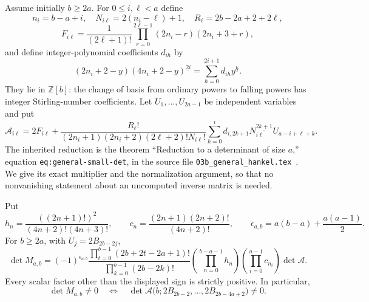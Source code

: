 Assume initially $b\ge2a$. For $0\le i,\ell<a$ define
\[
 n_i=b-a+i,\quad N_{i\ell}=2(n_i-\ell)+1,\quad
 R_\ell=2b-2a+2+2\ell,
\]
\[
 F_{i\ell}=\frac1{(2\ell+1)!}
 \prod_{r=0}^{2\ell-1}(2n_i-r)(2n_i+3+r),
\]
and define integer-polynomial coefficients $d_{ih}$ by
\begin{equation}\label{ert:newton}
 (2n_i+2-y)(4n_i+2-y)^{\underline{2i}}
       =\sum_{h=0}^{2i+1}d_{ih}y^{\underline h}.
\end{equation}
They lie in $\mathbb Z[b]$: the change of basis from ordinary
powers to falling powers has integer Stirling-number coefficients.
Let $U_1,\ldots,U_{2a-1}$ be independent variables and put
\begin{equation}\label{ert:A}
 \mathcal A_{i\ell}=2F_{i\ell}+
 \frac{R_\ell!}
 {(2n_i+1)(2n_i+2)(2\ell+2)!N_{i\ell}!}
 \sum_{k=0}^{i}d_{i,2k+1}N_{i\ell}^{\underline{2k+1}}
            U_{a-i+\ell+k}.
\end{equation}
The inherited reduction is the theorem ``Reduction to a determinant
of size $a$,'' equation \texttt{eq:general-small-det}, in the source
file \texttt{03b\_general\_hankel.tex}~\cite{GeneralHankel}.
We give its exact multiplier and the normalization argument, so
that no nonvanishing statement about an uncomputed inverse matrix
is needed.

\begin{lemma}
\label{ert:normalization}
Put
\[
 h_n=\frac{((2n+1)!)^2}{(4n+2)!(4n+3)!},\qquad
 c_n=\frac{(2n+1)(2n+2)!}{(4n+2)!},
 \qquad \epsilon_{a,b}=a(b-a)+\frac{a(a-1)}2.
\]
For $b\ge2a$, with $U_j=2B_{2b-2j}$,
\begin{equation}\label{ert:exact-multiplier}
 \det M_{a,b}=(-1)^{\epsilon_{a,b}}
 \frac{\prod_{t=0}^{b-1}(2b+2t-2a+1)!}
      {\prod_{k=0}^{b-1}(2b-2k)!}
 \left(\prod_{n=0}^{b-a-1}h_n\right)
 \left(\prod_{i=0}^{a-1}c_{n_i}\right)\det\mathcal A.
\end{equation}
Every scalar factor other than the displayed sign is strictly
positive. In particular,
\begin{equation}\label{ert:equivalence}
 \det M_{a,b}\ne0
 \quad\Longleftrightarrow\quad
 \det\mathcal A\bigl(b;2B_{2b-2},\ldots,2B_{2b-4a+2}\bigr)\ne0.
\end{equation}
\end{lemma}

